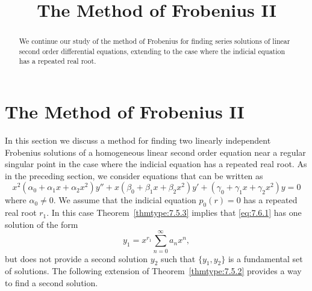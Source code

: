 \documentclass{ximera}
\title{The Method of Frobenius II}%
\begin{document}
\begin{abstract}
We continue our study of the method of Frobenius for finding series solutions of linear second order differential equations, extending to the case where the indicial equation has a repeated real root.
\end{abstract}

\maketitle

\section*{The Method of Frobenius II}

In this section we discuss a method for finding two linearly
independent Frobenius solutions of a homogeneous linear second order
equation near a regular singular point in the case where the indicial
equation has a repeated real root. As in the preceding section, we
consider equations that can be written as
\begin{equation} \label{eq:7.6.1}
x^2(\alpha_0+\alpha_1x+\alpha_2x^2)y''+x(\beta_0+\beta_1x+\beta_2x^2)y'
+(\gamma_0+\gamma_1x+\gamma_2x^2)y=0
\end{equation}
where $\alpha_0\ne0$. We assume that the indicial equation $p_0(r)=0$
has a repeated real root $r_1$. In this case Theorem~\ref{thmtype:7.5.3}
implies that \eqref{eq:7.6.1} has one solution of the form
$$
y_1=x^{r_1}\sum_{n=0}^\infty a_nx^n,
$$
but does not provide a second solution $y_2$ such that $\{y_1,y_2\}$
is a fundamental set of solutions. The following extension of
Theorem~\ref{thmtype:7.5.2} provides a way to find a second solution.
\end{document}
